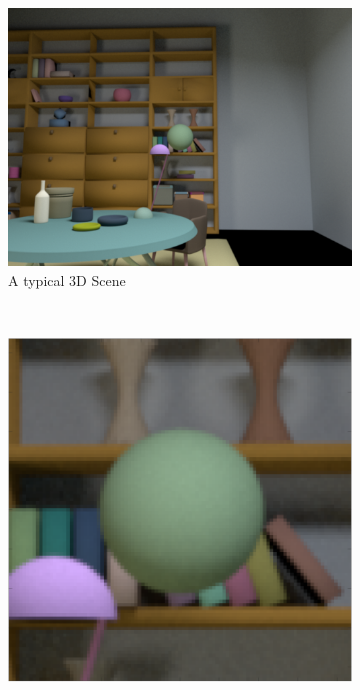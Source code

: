 \documentclass{jov}
\begin{document}
\begin{figure}
\centering
\begin{subfigure}[b]{0.25 \textwidth}
		\centering
        \includegraphics[width=\textwidth]{../Figures/Figure3/Figure3_a.png}
        \caption{A typical 3D Scene}
        \label{fig:3DScene}
    \end{subfigure}
    ~ %
    \begin{subfigure}[b]{0.19 \textwidth}   
    \hspace{0.1 \textwidth}
        \includegraphics[width=\textwidth]{../Figures/Figure3/Figure3_b.png}

\end{subfigure}
\end{figure}
\end{document}
